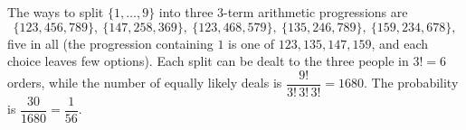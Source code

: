 The ways to split $\{1,\dots,9\}$ into three $3$-term arithmetic progressions are
\[\{123,456,789\},\ \{147,258,369\},\ \{123,468,579\},\ \{135,246,789\},\ \{159,234,678\},\]
five in all (the progression containing $1$ is one of $123,135,147,159$, and each choice leaves few options). Each split can be dealt to the three people in $3!=6$ orders, while the number of equally likely deals is $\dfrac{9!}{3!\,3!\,3!}=1680$. The probability is $\dfrac{30}{1680}=\boxed{\dfrac1{56}}$.
